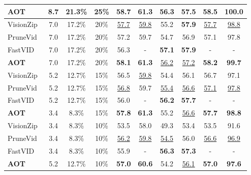 \begin{table}[t]
{\begin{tabular}{l|ccc|cccc|cc}
\textbf{AOT} & 8.7 & 21.3\% & 25\%
& \textbf{58.7} & \textbf{61.3} & 56.3 & 57.5 & \textbf{58.5} &  \textbf{100.0} \\ %
\midrule
VisionZip~\cite{yang2025visionzip} & 7.0 & 17.2\% & 20\%
& \underline{57.7} & \underline{59.8} & 55.2 & \textbf{57.9} & \underline{57.7} & \underline{98.8} \\ %

PruneVid~\cite{huang2024prunevid} & 7.0 & 17.2\% & 20\%
& 57.2 & 59.7 & 54.7 & 56.9 & 57.1 & 97.8 \\ %

FastVID~\cite{shen2025fastvid} & 7.0 & 17.2\% & 20\%
& 56.3 & - & \textbf{57.1} & \textbf{57.9} & - & - \\

\textbf{AOT} & 7.0 & 17.2\% & 20\%
& \textbf{58.1}  & \textbf{61.3} & \underline{56.2} & \underline{57.2} & \textbf{58.2} & \textbf{99.7} \\ %
\midrule
VisionZip~\cite{yang2025visionzip} & 5.2 & 12.7\% & 15\%
& 56.5 & \underline{59.8} & 54.4 & 56.1 & 56.7 & 97.1 \\ %

PruneVid~\cite{huang2024prunevid} & 5.2 & 12.7\% & 15\%
& \underline{56.8} & 59.7 & \underline{55.4} & \underline{56.6} & \underline{57.1} & \underline{97.8} \\ %

FastVID~\cite{shen2025fastvid} & 5.2 & 12.7\% & 15\% & 56.0 & - & \textbf{56.2} & \textbf{57.7} & - & - \\

\textbf{AOT} & 3.4 & 8.3\% & 15\%
& \textbf{57.8}  & \textbf{61.3} & 55.2 & \underline{56.6} & \textbf{57.7} & \textbf{98.8} \\ %
\midrule
VisionZip~\cite{yang2025visionzip} & 3.4 & 8.3\% & 10\% 
& 53.5 & 58.0 & 49.3 & 53.4 & 53.5 & 91.6 \\ %

PruneVid~\cite{huang2024prunevid} & 3.4 & 8.3\% & 10\% 
 & \underline{56.2} & \underline{59.8} & \underline{54.5} & 56.0 & \underline{56.6} & \underline{96.9} \\ %

FastVID~\cite{shen2025fastvid} & 3.4 & 8.3\% & 10\% 
& 55.9 & - & \textbf{56.3} & \textbf{57.3} & - & - \\

\textbf{AOT} & 5.2 & 12.7\% & 10\%
& \textbf{57.0}  & \textbf{60.6} & 54.2 & \underline{56.1} & \textbf{57.0} & \textbf{97.6} \\ %
\bottomrule

\end{tabular}
}
\label{tab:ov_benchmark}
\vspace{-0.2cm}
\end{table}



